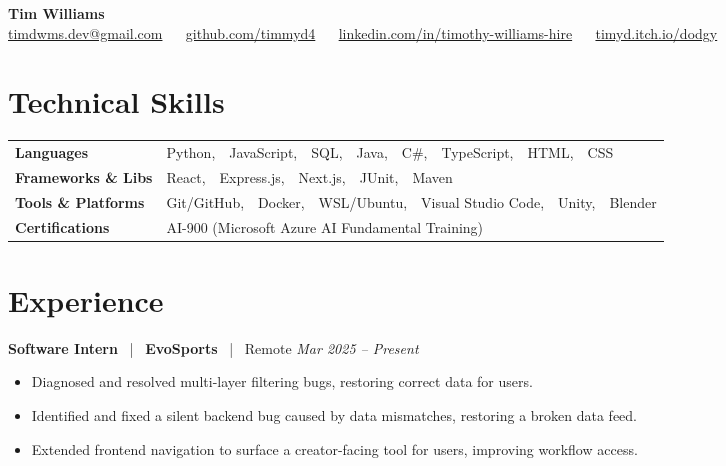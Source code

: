 \documentclass[10pt, letterpaper]{article}
\newcommand{\jobhead}[4]{%
  \vspace{5pt}%
  {\bfseries\color{dark}#1}%
  ~{\color{light}|}~%
  {\bfseries\color{navy}#2}%
  ~{\color{light}|}~%
  {\color{light}#3}%
  \hfill{\color{light}\small\textit{#4}}\\[-2pt]%
}
\newcommand{\skillrow}[2]{%
  {\bfseries #1} & #2 \\[2pt]%
}
\begin{document}

\begin{center}
  {\huge\bfseries\color{navy} Tim Williams}\\[4pt]
  {\small\color{light}
    \href{mailto:timdwms.dev@gmail.com}{timdwms.dev@gmail.com}
    ~\textbullet~
    \href{https://github.com/timmyd4}{github.com/timmyd4}
    ~\textbullet~
    \href{https://www.linkedin.com/in/timothy-williams-hire}{linkedin.com/in/timothy-williams-hire}
    ~\textbullet~
    \href{https://timyd.itch.io/dodgy}{timyd.itch.io/dodgy}
  }
\end{center}

\vspace{2pt}

\section{Technical Skills}

\begin{tabular}{@{}p{1.6in} p{5.2in}@{}}
  \skillrow{Languages}{Python,\ \ JavaScript,\ \ SQL,\ \ Java,\ \ C\#,\ \ TypeScript,\ \ HTML,\ \ CSS}
  \skillrow{Frameworks \& Libs}{React,\ \ Express.js,\ \ Next.js,\ \ JUnit,\ \ Maven}
  \skillrow{Tools \& Platforms}{Git/GitHub,\ \ Docker,\ \ WSL/Ubuntu,\ \ Visual Studio Code,\ \ Unity,\ \ Blender}
  \skillrow{Certifications}{AI-900 (Microsoft Azure AI Fundamental Training)}
\end{tabular}

\section{Experience}

\jobhead{Software Intern}{EvoSports}{Remote}{Mar 2025 – Present}
\begin{itemize}
  \item Diagnosed and resolved multi-layer filtering bugs, restoring correct data for users.
  \item Identified and fixed a silent backend bug caused by data mismatches, restoring a broken data feed.
  \item Extended frontend navigation to surface a creator-facing tool for users, improving workflow access.
\end{itemize}
\end{document}
